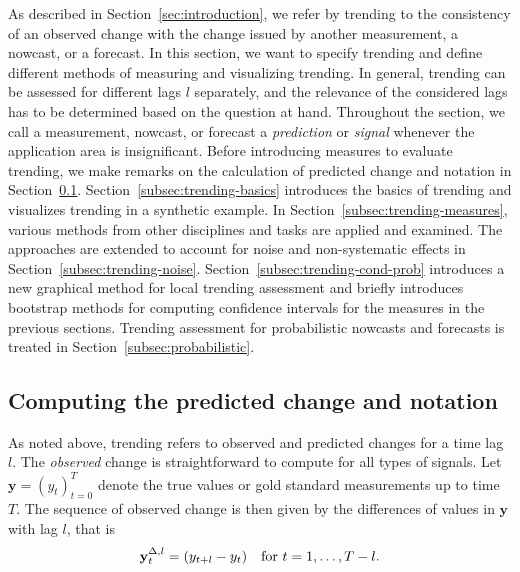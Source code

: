 
As described in Section~\ref{sec:introduction}, we refer by trending to the consistency of an observed change with the change issued by another measurement, a nowcast, or a forecast.
In this section, we want to specify trending and define different methods of measuring and visualizing trending.
In general, trending can be assessed for different lags $l$ separately, and the relevance of the considered lags has to be determined based on the question at hand.
Throughout the section, we call a measurement, nowcast, or forecast a \textit{prediction} or \textit{signal} whenever the application area is insignificant.
Before introducing measures to evaluate trending, we make remarks on the calculation of predicted change and notation in Section~\ref{subsec:notation}.
Section~\ref{subsec:trending-basics} introduces the basics of trending and visualizes trending in a synthetic example.
In Section~\ref{subsec:trending-measures}, various methods from other disciplines and tasks are applied and examined.
The approaches are extended to account for noise and non-systematic effects in Section~\ref{subsec:trending-noise}.
Section~\ref{subsec:trending-cond-prob} introduces a new graphical method for local trending assessment and briefly introduces bootstrap methods for computing confidence intervals for the measures in the previous sections.
Trending assessment for probabilistic nowcasts and forecasts is treated in Section~\ref{subsec:probabilistic}.

\subsection{Computing the predicted change and notation}\label{subsec:notation}

As noted above, trending refers to observed and predicted changes for a time lag $l$.
The \textit{observed} change is straightforward to compute for all types of signals.
Let $\mathbf{y} = (y_t)_{t=0}^T$ denote the true values or gold standard measurements up to time $T$.
The sequence of observed change is then given by the differences of values in $\mathbf{y}$ with lag $l$, that is
\begin{equation}\label{eq:diffy}
    \mathbf{y}^{\Delta,l}_t = (y_{t+l} - y_t) \quad \text{for}\ t = 1, \dots, T - l.
\end{equation}


